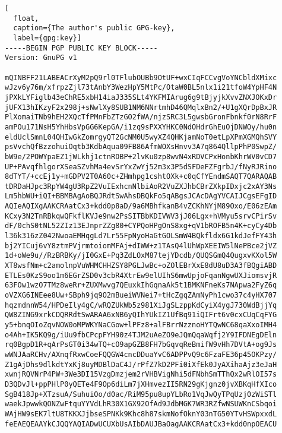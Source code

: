 \begin{lstlisting}[
  float,
  caption={The author's public GPG-key},
  label={gpg:key}]
-----BEGIN PGP PUBLIC KEY BLOCK-----
Version: GnuPG v1

mQINBFF21LABEACrXyM2pQ9rl0TFlubOUBb9OtUF+wxCIqFCCvgVoYNCbldXMixc
wJzv6y76m/xfrpzZjl73tAnbY3WezHpY5MtPc/OtaW0BL5nlx1i21tfoW4YpHF4N
jPXkLYFiglb43eChRE5xbH14iaJ335SLt4YKFMIArug6g9tBjyjkXvvZNXJOKxDr
jUFX13hIKzyF2x298j+sNwlXy8SUB1NM6NNrtmhD46QMqlxBn2/+U1gXQrDpBxJR
PlXomaiTNb9hEH2XQcTfPMnFbZTzGO2fWA/njzSRC3L5gwsbGronFbnkf0rN8RrF
amPOu171NsH5YhHbsVpGG6KepGA/i1zq9sPXXYHKC0NdOHdrGhEuOjDNWOy/hu0n
eldUclSmnL04QHIwGkZomrgyQT2GcNM0U5wyXZ4QHKjamNoT0etLpXPmXGMQhSVY
psVvchQfBzzohuiOqtb3KdbAqua09FB86AfmWOXsHnvv3A7q864QllpPhP0SwpZ/
bW9e/2POWYpaEZ1jWLkhj1ctnRDBP+2lvKu0zp8wvN4xRDVCPxHonbKhrWV0vCD7
UP+PAvqfhlgorXSeaSZvhMa4evSrYxZwYj52m3x3P5dSFDeFZFgrbJ/fNyRJRino
8dTYT/+ccEj1y+mGDPV2T0A60c+ZHmhpg1cshtOXk+c0qCfYEndmSAQT7QARAQAB
tDRDaHJpc3RpYW4gU3RpZ2VuIExhcnNlbiAoR2VuZXJhbCBrZXkpIDxjc2xAY3Ns
Lm5hbWU+iQI+BBMBAgAoBQJRdtSwAhsDBQkFo5qABgsJCAcDAgYVCAIJCgsEFgID
AQIeAQIXgAAKCRAatCx3+kdd0p8aD/9a6MBhfkanB4vZCKhNYjM89Oxo/E06zEAm
KCxy3N2TnRBkqwQFkflKVJe9nw2PsSITBbKDIVWV3jJ06Lgx+hVMyu5srvCPirSv
dF/0chS0tNL52ZIz13EJnprZZg80+CYPQoHPgOnS8xg+qV1bROFB5n4K+cyCy4Db
l36k316zZ042NwoaEMHqgLd7Lr55FpNyoHaGtGOLSmW4BQkfldx6G1kdJefFY43h
bj2YICuj6vY8ztmPVjrmtoiomMFAj+dIWW+z1TAsQ4lUhWpXEEIW5lNePBce2jVZ
1d+oWe9u//RzBRBKy/jI0GxE+Pq3ZdLOxM87tejYDcdb/QUQSGmQ4QugxvKXol5W
XT8wsfNm+c2amolnpVuWHMCHHZSY8PGLJwBc+oZOlEBrXxE8dU8uD3A3fBQgiABD
ETLEs0KzS9oo1m6EGrZSD0v3cbR4XtrEw9elUIhS6mwUpjoFqanNgwUXJiomsvjR
63FOw1wzO7TMz8weRr+ZUXMwvg7QEuxkIhGqnaAk5t1BMKNFneKs7NApwa2FyZ6q
oVZXG6INEee8Uw+SBph9jq9O2mBueiWVNei7+tHcZgqZAmNyPh1cwo37c4yHX707
hqzmdnnW54/HPDeIly4gC/wRQZUkWb5z981XiJgSLzppKdCyiX4ygJ730WdBjjYq
QW8ZING9xrkCDQRRdtSwARAA6xNB6yQIhYUkIZ1UfBq91iQIFrt6v0cxCUqCqFYG
y5+bnqOIoZqvNOW0oMPWKYNaCGow+lPFz8+alFBrrNzznoHYTQwNC68qaXxoIMH4
o4Ah+IK5KQ9g/iUu9fbCPcpFYH90z4TJM2uAeZO9eJQmQqaWqfj2Y9IFDNEgDEln
rq0BgpD1R+qArPsGT0i34wTQ+cO9apGZB8FH7bGqvqReBmifW9vHh7DVtA+og9Js
wWNJAaRCHv/AXnqfRxwCoeFQQGW4cncDDuaYvC6ADPPvQ9c6FzaFE36p45OKPzy/
Z1gAjDhs9dlkdtYxKj8uyMDBlDaC4J/rPfZ7kD2PFi0iXfEk0JyAXihaAjz3eJaH
xwnjRQVNrP4PW+3We3DI15VzgDmzjem2rVHBVigNhi5dFNbhSmTThQx2wRlOI57s
D3QDvJl+ppPHlP0yQETe4F9Op6diLm7jXHmvezII5RN29gKjgnz0jvXBKqHfXIco
SgB418Jp+XTzsuA/SuhuiOo/d0ac/RiM95pu8upYLbRo1VqJwQyTPqUzj0zWiSTl
waekJpwwkQONZwFtquYYVdLhR30X1GX92OfAd9JdbMGK7WR3RZfwNSUWKnCSbqoi
WAjHW9sEK7ltU8TKKXJjbseSPNKk9Khc8h87skmNofOknY03nTG50YTvHSWpxxdL
feEAEQEAAYkCJQQYAQIADwUCUXbUsAIbDAUJBaOagAAKCRAatCx3+kdd0npOEACU

\end{lstlisting}
